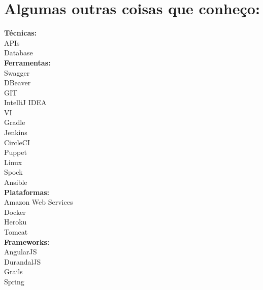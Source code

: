 \documentclass[]{friggeri-cv}
\begin{document}
\section{Algumas outras coisas que conheço:}
\begin{multicols}{3}
    \textbf{Técnicas:}\\
    APIs\\
    Database\\
    \textbf{Ferramentas:}\\
    Swagger\\
    DBeaver\\
    GIT\\
    IntelliJ IDEA\\
    VI\\
    Gradle\\
    Jenkins\\
    CircleCI\\
    Puppet\\
    Linux\\
    Spock\\
    Ansible\\
    \textbf{Plataformas:}\\
    Amazon Web Services\\
    Docker\\
    Heroku\\
    Tomcat\\
    \textbf{Frameworks:}\\
    AngularJS\\
    DurandalJS\\
    Grails\\
    Spring
\end{multicols}
\end{document}
